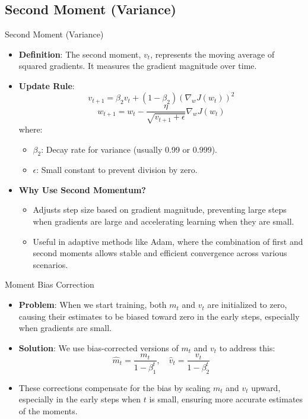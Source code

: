 \documentclass[serif, aspectratio=169]{beamer}
\begin{document}
\subsection{Second Moment (Variance)}
\begin{frame}{Second Moment (Variance)}
    \begin{itemize}
        \item \textbf{Definition}: The second moment, \( v_t \), represents the moving average of squared gradients. It measures the gradient magnitude over time.
        \item \textbf{Update Rule}:
        \[
        v_{t+1} = \beta_2 v_t + (1 - \beta_2) (\nabla_w J(w_t))^2
        \]
        \[
        w_{t+1} = w_t - \frac{\eta}{\sqrt{v_{t+1} + \epsilon}} \nabla_w J(w_t)
        \]
        where:
        \begin{itemize}
            \item \( \beta_2 \): Decay rate for variance (usually 0.99 or 0.999).
            \item \( \epsilon \): Small constant to prevent division by zero.
        \end{itemize}
        \item \textbf{Why Use Second Momentum?}
        \begin{itemize}
            \item Adjusts step size based on gradient magnitude, preventing large steps when gradients are large and accelerating learning when they are small.
            \item Useful in adaptive methods like Adam, where the combination of first and second moments allows stable and efficient convergence across various scenarios.
        \end{itemize}
    \end{itemize}
\end{frame}

\begin{frame}{Moment Bias Correction}
    \begin{itemize}
        \item \textbf{Problem}: When we start training, both $m_{t}$ and $v_{t}$ are initialized to zero, causing their estimates to be biased toward zero in the early steps, especially when gradients are small.
        \item \textbf{Solution}: We use bias-corrected versions of $m_{t}$ and $v_{t}$ to address this:
        \[\hat{m}_{t} = \frac{m_{t}}{1 - \beta_1^{t}}, \quad 
        \hat{v}_{t} = \frac{v_{t}}{1 -\beta_2^{t}}\]
        \item These corrections compensate for the bias by scaling $m_{t}$ and $v_{t}$ upward, especially in the early steps when $t$ is small, ensuring more accurate estimates of the moments.
    \end{itemize}
\end{frame}
\end{document}
